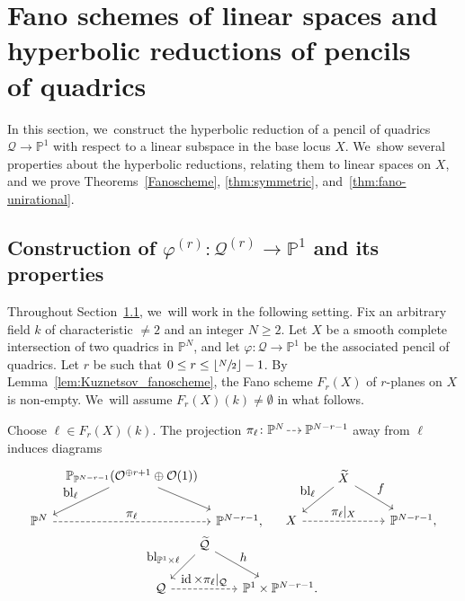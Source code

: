 \documentclass[JEP,XML,SOM,Unicode,NoEqCountersInSection,published]{cedram}
\let\ligne \\
\let\ts\textstyle
\newcommand{\dradpl}{{\hspace*{-2.5mm}\begin{tikzcd}[ampersand replacement=\&,column sep = scriptsize]\mbox{}\ar[r,dashed]\&\mbox{}\end{tikzcd}\hspace*{-2.5mm}}}
\newcommand{\dratst}{{\hspace*{-2.5mm}\begin{tikzcd}[ampersand replacement=\&,column sep = small]\mbox{}\ar[r,dashed]\&\mbox{}\end{tikzcd}\hspace*{-2mm}}}
\let\drascst\dratst
\newcommand{\dra}{\mathchoice{\dradpl}{\dratst}{\drascst}{\drascst}}
\let \dashrightarrow\dra
\let\cal\mathcal
\let\bb\mathbb\let\Bbb\mathbb
\theoremstyle{plain}
\theoremstyle{definition}
\DeclareMathOperator{\bl}{bl}
\DeclareMathOperator{\id}{id}
\let\phi\varphi
\renewcommand\P{\mathbb{P}}
\renewcommand\O{\mathcal{O}}
\begin{document}
\section{Fano schemes of linear spaces and hyperbolic reductions of pencils\texorpdfstring{\protect\ligne}{ligne} of quadrics}\label{section-fano-hyperbolic}

In this section, we~construct the hyperbolic reduction of a pencil of quadrics \(\cal Q \to \bb P^1\) with respect to a linear subspace in the base locus \(X\). We~show several properties about the hyperbolic reductions, relating them to linear spaces on \(X\), and we prove Theorems~\ref{Fanoscheme}, \ref{thm:symmetric}, and~\ref{thm:fano-unirational}.

\subsection{Construction of $\phi^{(r)}\colon\mathcal{Q}^{(r)}\to\P^1$ and its properties}\label{sec:Q^(r)-construction}

Throughout Section~\ref{sec:Q^(r)-construction}, we~will work in the following setting.
Fix an arbitrary field $k$ of characteristic $\neq 2$ and an integer $N\geq 2$. Let $X$ be a smooth complete intersection of two quadrics in $\P^N$, and let $\phi\colon \mathcal{Q}\to \P^1$ be the associated pencil of quadrics.
Let $r$ be such that $0\leq r\leq \lfloor\sfrac{N}{2}\rfloor -1$.
By Lemma~\ref{lem:Kuznetsov_fanoscheme}, the Fano scheme $F_r(X)$ of $r$-planes on $X$ is non-empty. We~will assume $F_r(X)(k)\neq \emptyset$ in what follows.

Choose
$\ell\in F_r(X)(k)$. The projection $\pi_{\ell}\colon\bb P^N \dashrightarrow \bb P^{N-r-1}$ away from $\ell$ induces diagrams
\[
\begin{array}{c}
\begin{tikzcd}[column sep=tiny]
&\P_{\P^{N-r-1}}(\O^{\oplus r+1}\oplus \O(1))\arrow[ld, "\ts \bl_{\ell}"'] \arrow[rd] & \\
\P^{N} \arrow[rr, "\ts \pi_{\ell}", dashed]& & \P^{N-r-1},
\end{tikzcd}
\quad
\begin{tikzcd}
& \widetilde{X} \arrow[ld, "\ts \bl_{\ell}"'] \arrow[rd, "\ts f"] & \\
X \arrow[rr, "\ts \pi_{\ell}|_X", dashed]& & \P^{N-r-1},
\end{tikzcd}
\\
\begin{tikzcd}[column sep=scriptsize]
& \widetilde{\mathcal{Q}} \arrow[ld, "\ts \bl_{\P^1\times \ell}"'] \arrow[rd, "\ts h"] & \\
\mathcal{Q} \arrow[rr, "\ts \id\times \pi_{\ell}|_{\mathcal{Q}}", dashed]& & \P^1\times \P^{N-r-1}.
\end{tikzcd}
\end{array}
\]
\end{document}
